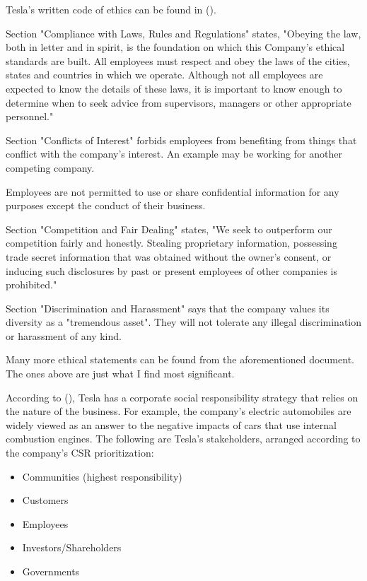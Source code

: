 \documentclass[12pt]{article}
\begin{document}
Tesla's written code of ethics can be found in (\cite{te10}).

Section "Compliance with Laws, Rules and Regulations" states, "Obeying the law, both in letter and in spirit, is the foundation on which this Company's ethical standards are built. All employees must respect and obey the laws of the cities, states and countries in which we operate. Although not all employees are expected to know the details of these laws, it is important to know enough to determine when to seek advice from supervisors, managers or other appropriate personnel."

Section "Conflicts of Interest" forbids employees from benefiting from things that conflict with the company's interest. An example may be working for another competing company.

Employees are not permitted to use or share confidential information for any purposes except the conduct of their business.

Section "Competition and Fair Dealing" states, "We seek to outperform our competition fairly and honestly. Stealing proprietary information, possessing trade secret information that was obtained without the owner's consent, or inducing such disclosures by past or present employees of other companies is prohibited."

Section "Discrimination and Harassment" says that the company values its diversity as a "tremendous asset". They will not tolerate any illegal discrimination or harassment of any kind.

Many more ethical statements can be found from the aforementioned document. The ones above are just what I find most significant.

According to (\cite{gr17}), Tesla has a corporate social responsibility strategy that relies on the nature of the business. For example, the company's electric automobiles are widely viewed as an answer to the negative impacts of cars that use internal combustion engines. The following are Tesla's stakeholders, arranged according to the company's CSR prioritization:

\begin{itemize}
	\item{Communities (highest responsibility)}
	\item{Customers}
	\item{Employees}
	\item{Investors/Shareholders}
	\item{Governments}
\end{itemize}
\end{document}

